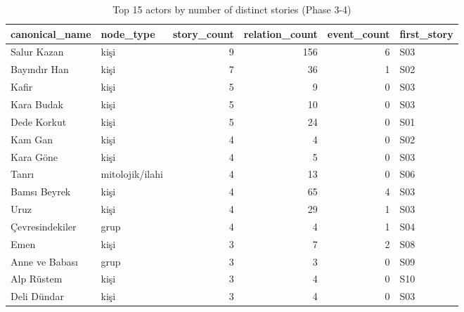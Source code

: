 \begin{table}
\caption{Top 15 actors by number of distinct stories (Phase 3-4)}
\label{tab:t07_actor_story_participation}
\begin{tabular}{llrrrl}
\toprule
canonical_name & node_type & story_count & relation_count & event_count & first_story \\
\midrule
Salur Kazan & kişi & 9 & 156 & 6 & S03 \\
Bayındır Han & kişi & 7 & 36 & 1 & S02 \\
Kafir & kişi & 5 & 9 & 0 & S03 \\
Kara Budak & kişi & 5 & 10 & 0 & S03 \\
Dede Korkut & kişi & 5 & 24 & 0 & S01 \\
Kam Gan & kişi & 4 & 4 & 0 & S02 \\
Kara Göne & kişi & 4 & 5 & 0 & S03 \\
Tanrı & mitolojik/ilahi & 4 & 13 & 0 & S06 \\
Bamsı Beyrek & kişi & 4 & 65 & 4 & S03 \\
Uruz & kişi & 4 & 29 & 1 & S03 \\
Çevresindekiler & grup & 4 & 4 & 1 & S04 \\
Emen & kişi & 3 & 7 & 2 & S08 \\
Anne ve Babası & grup & 3 & 3 & 0 & S09 \\
Alp Rüstem & kişi & 3 & 4 & 0 & S10 \\
Deli Dündar & kişi & 3 & 4 & 0 & S03 \\
\bottomrule
\end{tabular}
\end{table}
